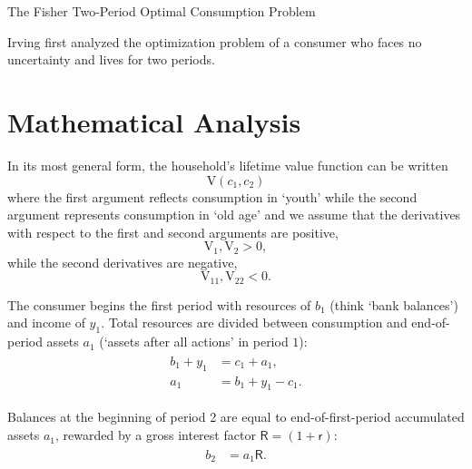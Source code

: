 \documentclass{scrartcl}
\begin{document}
\handoutHeader

{\centerline {\LARGE The Fisher Two-Period Optimal Consumption Problem }}\vspace{0.15in}



  Irving \cite{fisherInterestTheory} first analyzed the optimization
  problem of a consumer who faces no uncertainty and lives for two
  periods.  

  \section{Mathematical Analysis}

  In its most general form, the household's lifetime value function can be written
  \[
    \mathrm{V}(\boldsymbol{\mathit{c}}_{1},\boldsymbol{\mathit{c}}_{2})
  \]
  where the first argument reflects consumption in `youth' while the second argument represents consumption in `old age' and we assume that the derivatives with respect to the first and second arguments are positive,
  \begin{equation}
    \mathrm{V}_{1}, \mathrm{V}_{2} > 0, \label{eq:uprimepos}
  \end{equation}
  while the second derivatives are negative,
  \begin{equation}
    \mathrm{V}_{11}, \mathrm{V}_{22}<0 \label{eq:uprimeprimeneg}.
  \end{equation}

  The consumer begins the first period with resources of $\boldsymbol{\mathit{b}}_{1}$ (think `bank balances') and income of $\boldsymbol{\mathit{y}}_{1}$.  Total resources are divided between consumption and end-of-period assets $\boldsymbol{\mathit{a}}_{1}$ (`assets after all actions' in period ${1}$):
  \begin{equation}\begin{gathered}\begin{aligned}
        \boldsymbol{\mathit{b}}_{1}+\boldsymbol{\mathit{y}}_{1} & =  \boldsymbol{\mathit{c}}_{1}+\boldsymbol{\mathit{a}}_{1},
        \\ \boldsymbol{\mathit{a}}_{1} & =  \boldsymbol{\mathit{b}}_{1}+\boldsymbol{\mathit{y}}_{1}-\boldsymbol{\mathit{c}}_{1}.
      \end{aligned}\end{gathered}\end{equation}

  Balances at the beginning of period 2 are equal to end-of-first-period accumulated assets $\boldsymbol{\mathit{a}}_{1}$, rewarded by a gross interest factor $\mathsf{R} = (1+\mathsf{r})$:
  \begin{equation}\begin{gathered}\begin{aligned}
        \boldsymbol{\mathit{b}}_{2} & =  \boldsymbol{\mathit{a}}_{1}\mathsf{R}.
      \end{aligned}\end{gathered}\end{equation}
\end{document}
